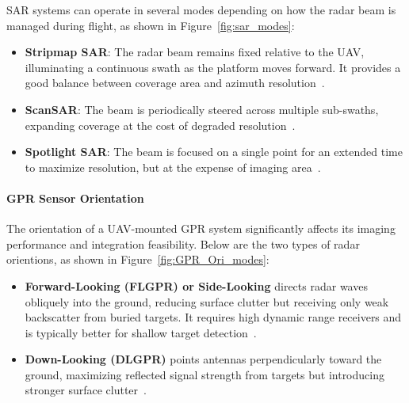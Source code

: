 SAR systems can operate in several modes depending on how the radar beam is managed during flight, as shown in Figure~\ref{fig:sar_modes}:

\begin{itemize}
    \item \textbf{Stripmap SAR}: The radar beam remains fixed relative to the UAV, illuminating a continuous swath as the platform moves forward. It provides a good balance between coverage area and azimuth resolution~\cite{moreira2013tutorial}.
    \item \textbf{ScanSAR}: The beam is periodically steered across multiple sub-swaths, expanding coverage at the cost of degraded resolution~\cite{moreira2013tutorial}.
    \item \textbf{Spotlight SAR}: The beam is focused on a single point for an extended time to maximize resolution, but at the expense of imaging area~\cite{moreira2013tutorial}.
\end{itemize}


\paragraph{GPR Sensor Orientation}

The orientation of a UAV-mounted GPR system significantly affects its imaging performance and integration feasibility. Below are the two types of radar orientions, as shown in Figure~\ref{fig:GPR_Ori_modes}:

\begin{itemize}
    \item \textbf{Forward-Looking (FLGPR) or Side-Looking} directs radar waves obliquely into the ground, reducing surface clutter but receiving only weak backscatter from buried targets. It requires high dynamic range receivers and is typically better for shallow target detection~\cite{garcia2020airborne}.
    \item \textbf{Down-Looking (DLGPR)} points antennas perpendicularly toward the ground, maximizing reflected signal strength from targets but introducing stronger surface clutter~\cite{garcia2020airborne}.
\end{itemize}


